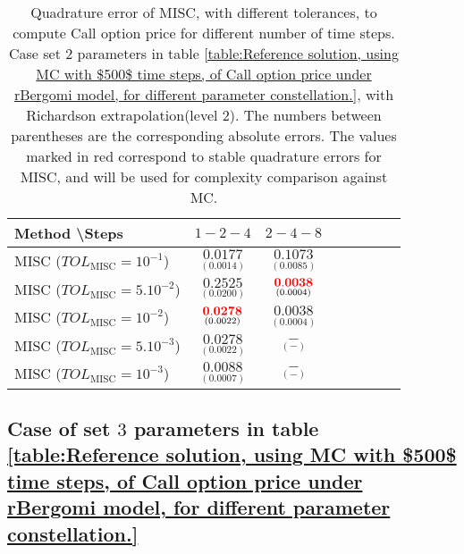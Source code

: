 \begin{table}[!h]
	\centering
	\begin{tabular}{l*{6}{c}r}
		Method \textbackslash  Steps            & $1-2-4$ & $2-4-8$  \\
		\hline
		MISC ($TOL_{\text{MISC}}=10^{-1}$)  & $\underset{(    0.0014)}{\mathbf{  0.0177}}$ & $\underset{(  0.0085)}{\mathbf{0.1073}}$  \\
		MISC ($TOL_{\text{MISC}}=5.10^{-2}$)  & $\underset{(  0.0200)}{\mathbf{  0.2525}}$ & $\underset{(0.0004)}{\mathbf{{\color{red}0.0038}}}$   \\
		MISC ($TOL_{\text{MISC}}=10^{-2}$)  & $\underset{(0.0022)}{\mathbf{{\color{red}0.0278}}}$ &     $\underset{(0.0004)}{\mathbf{0.0038}}$  \\
		
		MISC ($TOL_{\text{MISC}}=5.10^{-3}$)  & $\underset{(0.0022)}{\mathbf{0.0278}}$&    $\underset{(-
			)}{\mathbf{-}}$ \\
		MISC ($TOL_{\text{MISC}}=10^{-3}$)  & $\underset{(0.0007
			)}{\mathbf{
				0.0088}}$ &    $\underset{(-
			)}{\mathbf{ -}}$ \\
		
		
		\hline
	\end{tabular}
	\caption{Quadrature error of MISC, with different tolerances, to compute Call option price   for different number of time steps. Case set $2$ parameters in table \ref{table:Reference solution, using MC with $500$ time steps, of Call option price under rBergomi model, for different parameter constellation.}, with Richardson extrapolation(level $2$). The numbers between parentheses are the corresponding absolute errors. The values marked in red correspond to stable quadrature errors for MISC, and will be used for complexity comparison against MC.}
	\label{Quadrature error of MISC to compute Call option price of the different tolerances for different number of time steps. Case set $2$ parameters, with Richardson extrapolation(level $2$). The numbers between parentheses are the corresponding absolute errors,linear}
\end{table}



\FloatBarrier

\subsection{Case of set $3$ parameters in table \ref{table:Reference solution, using MC with $500$ time steps, of Call option price under rBergomi model, for different parameter constellation.}}\label{appendix:Case of set 3 parameters}


